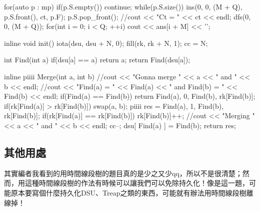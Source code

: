\begin{C++}
{{        for(auto p : mp){
            if(p.S.empty()) continue;
            while(p.S.size()){
                ins(0, 0, (M + Q), p.S.front(), ct, p.F);
                p.S.pop_front();
            }
        }
        //cout << "Ct = " << ct << endl;
        dfs(0, 0, (M + Q));
        for(int i = 0; i < Q; ++i){
            cout << ans[i + M] << '\n';
        }
    }
}

inline void init(){
    iota(dsu, dsu + N, 0);
    fill(rk, rk + N, 1);
    cc = N;
}

int Find(int a){
    if(dsu[a] == a) return a;
    return Find(dsu[a]);
}

inline piiii Merge(int a, int b){
    //cout << "Gonna merge " << a << " and " << b << endl;
    //cout << "Find(a) = " << Find(a) << " and Find(b) = " << Find(b) << endl;
    if(Find(a) == Find(b)) return {{Find(a), 0}, {Find(b), rk[Find(b)]}};
    if(rk[Find(a)] > rk[Find(b)]) swap(a, b);
    piiii res = {{Find(a), 1}, {Find(b), rk[Find(b)]}};
    if(rk[Find(a)] == rk[Find(b)]) rk[Find(b)]++;
    //cout << "Merging " << a << " and " << b << endl;
    cc--;
    dsu[ Find(a) ] = Find(b);
    return res;
}
\end{C++}

\subsection{其他用處}
	其實編者我看到的用時間線段樹的題目真的是少之又少qq，所以不是很清楚；然而，用這種時間線段樹的作法有時候可以讓我們可以免除持久化！像是這一題，可能原本要寫個什麼持久化DSU、Treap之類的東西，可能就有辦法用時間線段樹離線掉！
